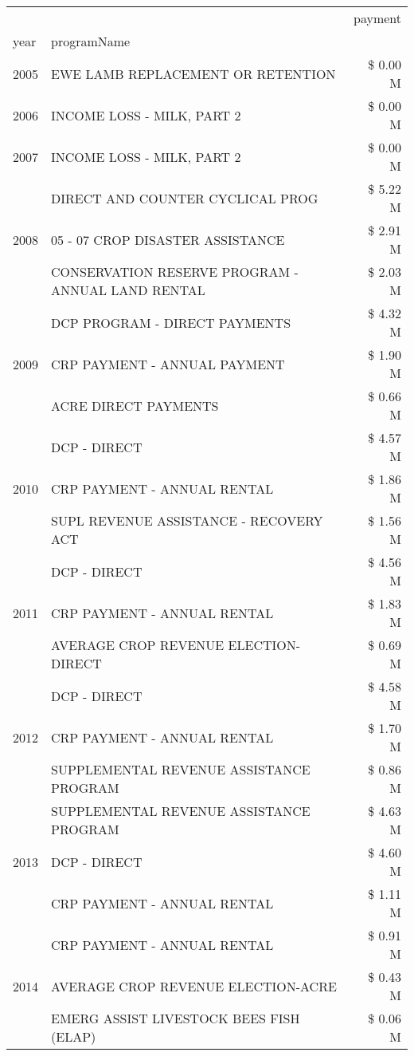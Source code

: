 \begin{tabular}{llr}
\toprule
 &  & payment \\
year & programName &  \\
\midrule
2005 & EWE LAMB REPLACEMENT OR RETENTION & \$ 0.00 M \\
\cline{1-3}
2006 & INCOME LOSS - MILK, PART 2 & \$ 0.00 M \\
\cline{1-3}
2007 & INCOME LOSS - MILK, PART 2 & \$ 0.00 M \\
\cline{1-3}
\multirow[t]{3}{*}{2008} & DIRECT AND COUNTER CYCLICAL PROG & \$ 5.22 M \\
 & 05 - 07 CROP DISASTER ASSISTANCE & \$ 2.91 M \\
 & CONSERVATION RESERVE PROGRAM - ANNUAL LAND RENTAL & \$ 2.03 M \\
\cline{1-3}
\multirow[t]{3}{*}{2009} & DCP PROGRAM - DIRECT PAYMENTS & \$ 4.32 M \\
 & CRP PAYMENT - ANNUAL PAYMENT & \$ 1.90 M \\
 & ACRE DIRECT PAYMENTS & \$ 0.66 M \\
\cline{1-3}
\multirow[t]{3}{*}{2010} & DCP - DIRECT & \$ 4.57 M \\
 & CRP PAYMENT - ANNUAL RENTAL & \$ 1.86 M \\
 & SUPL REVENUE ASSISTANCE - RECOVERY ACT & \$ 1.56 M \\
\cline{1-3}
\multirow[t]{3}{*}{2011} & DCP - DIRECT & \$ 4.56 M \\
 & CRP PAYMENT - ANNUAL RENTAL & \$ 1.83 M \\
 & AVERAGE CROP REVENUE ELECTION-DIRECT & \$ 0.69 M \\
\cline{1-3}
\multirow[t]{3}{*}{2012} & DCP - DIRECT & \$ 4.58 M \\
 & CRP PAYMENT - ANNUAL RENTAL & \$ 1.70 M \\
 & SUPPLEMENTAL REVENUE ASSISTANCE PROGRAM & \$ 0.86 M \\
\cline{1-3}
\multirow[t]{3}{*}{2013} & SUPPLEMENTAL REVENUE ASSISTANCE PROGRAM & \$ 4.63 M \\
 & DCP - DIRECT & \$ 4.60 M \\
 & CRP PAYMENT - ANNUAL RENTAL & \$ 1.11 M \\
\cline{1-3}
\multirow[t]{3}{*}{2014} & CRP PAYMENT - ANNUAL RENTAL & \$ 0.91 M \\
 & AVERAGE CROP REVENUE ELECTION-ACRE & \$ 0.43 M \\
 & EMERG ASSIST LIVESTOCK BEES FISH (ELAP) & \$ 0.06 M \\
\cline{1-3}

\end{tabular}

